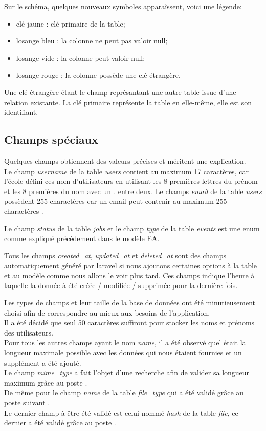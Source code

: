 \documentclass[
    iai, %
    il, %
]{heig-tb}
\begin{document}
Sur le schéma, quelques nouveaux symboles apparaîssent, voici une légende:
\begin{itemize}
    \item clé jaune : clé primaire de la table;
    \item losange bleu : la colonne ne peut pas valoir null;
    \item losange vide : la colonne peut valoir null;
    \item losange rouge : la colonne possède une clé étrangère.
\end{itemize}

Une clé étrangère étant le champ représantant une autre table issue d'une relation existante. La clé primaire représente la table en elle-même, elle est son identifiant.

\subsection{Champs spéciaux}
Quelques champs obtiennent des valeurs précises et méritent une explication.\\
Le champ \emph{username} de la table \emph{users} contient au maximum 17 caractères, car l'école défini ces nom d'utilisateurs en utilisant les 8 premières lettres du prénom et les 8 premières du nom avec un \emph{.} entre deux.
Le champs \emph{email} de la table \emph{users} possèdent 255 charactères car un email peut contenir au maximum 255 charactères \cite{email-length}.

Le champ \emph{status} de la table \emph{jobs} et le champ \emph{type} de la table \emph{events} est une enum comme expliqué précédement dans le modèle EA.

Tous les champs \emph{created\_at}, \emph{updated\_at} et \emph{deleted\_at} sont des champs automatiquement généré par \Gls{laravel} si nous ajoutons certaines options à la table et au modèle comme nous allons le voir plus tard. Ces champs indique l’heure à laquelle la donnée à été créée / modifiée / supprimée pour la dernière fois.

Les types de champs et leur taille de la base de données ont été minutieusement choisi afin de correspondre au mieux aux besoins de l'application. \\
Il a été décidé que seul 50 caractères suffiront pour stocker les noms et prénoms des utilisateurs. \\
Pour tous les autres champs ayant le nom \emph{name}, il a été observé quel était la longueur maximale possible avec les données qui nous étaient fournies et un supplément a été ajouté. \\
Le champ \emph{mime\_type} a fait l'objet d'une recherche afin de valider sa longueur maximum grâce au poste \cite{mime-type-length}. \\
De même pour le champ \emph{name} de la table \emph{file\_type} qui a été validé grâce au poste suivant \cite{extension-length}. \\
Le dernier champ à être été validé est celui nommé \emph{hash} de la table \emph{file}, ce dernier a été validé grâce au poste \cite{hash-256-length}.
\end{document}
